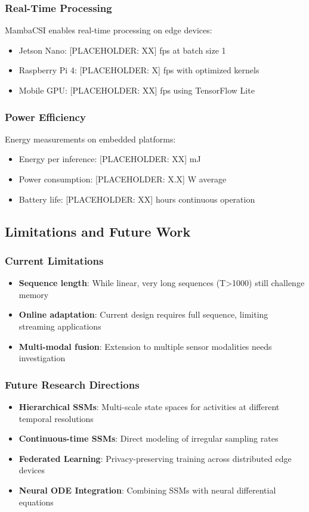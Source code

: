 \documentclass[journal]{IEEEtran}
\begin{document}
\subsubsection{Real-Time Processing}
MambaCSI enables real-time processing on edge devices:
\begin{itemize}
\item Jetson Nano: [PLACEHOLDER: XX] fps at batch size 1
\item Raspberry Pi 4: [PLACEHOLDER: X] fps with optimized kernels
\item Mobile GPU: [PLACEHOLDER: XX] fps using TensorFlow Lite
\end{itemize}

\subsubsection{Power Efficiency}
Energy measurements on embedded platforms:
\begin{itemize}
\item Energy per inference: [PLACEHOLDER: XX] mJ
\item Power consumption: [PLACEHOLDER: X.X] W average
\item Battery life: [PLACEHOLDER: XX] hours continuous operation
\end{itemize}

\subsection{Limitations and Future Work}

\subsubsection{Current Limitations}
\begin{itemize}
\item \textbf{Sequence length}: While linear, very long sequences (T>1000) still challenge memory
\item \textbf{Online adaptation}: Current design requires full sequence, limiting streaming applications
\item \textbf{Multi-modal fusion}: Extension to multiple sensor modalities needs investigation
\end{itemize}

\subsubsection{Future Research Directions}
\begin{itemize}
\item \textbf{Hierarchical SSMs}: Multi-scale state spaces for activities at different temporal resolutions
\item \textbf{Continuous-time SSMs}: Direct modeling of irregular sampling rates
\item \textbf{Federated Learning}: Privacy-preserving training across distributed edge devices
\item \textbf{Neural ODE Integration}: Combining SSMs with neural differential equations
\end{itemize}
\end{document}
